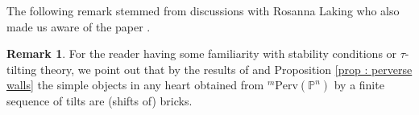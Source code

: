 \documentclass[11pt]{amsart}
\theoremstyle{definition}
\newtheorem{remark}[theorem]{Remark}
\newcommand{\N}{\mathbb{N}}
\newcommand{\C}{\mathbb{C}}
\newcommand{\kk}{\mathbbm{k}}
\newcommand{\PP}{\mathbb{P}}
\newcommand{\cat}[1]{\mathrm{#1}}
\newcommand{\perv}[2]{{}^{#1}\cat{Perv}\!\left(#2\right)}
\newcommand{\monic}{\hookrightarrow}
\newcommand{\alessio}[1]{\textcolor{red}{$[\star$ Alessio: #1 $\star]$}}
\begin{document}
The following remark stemmed from discussions with Rosanna Laking who also made us aware of the paper \cite{MR4545219}.

\begin{remark}
    For the reader having some familiarity with stability conditions or $\tau$-tilting theory, we point out that by the results of \cite{MR4545219} and Proposition \ref{prop : perverse walls} the simple objects in any heart obtained from $\perv{m}{\PP^n}$ by a finite sequence of tilts are (shifts of) bricks.   
\end{remark}












\end{document}
